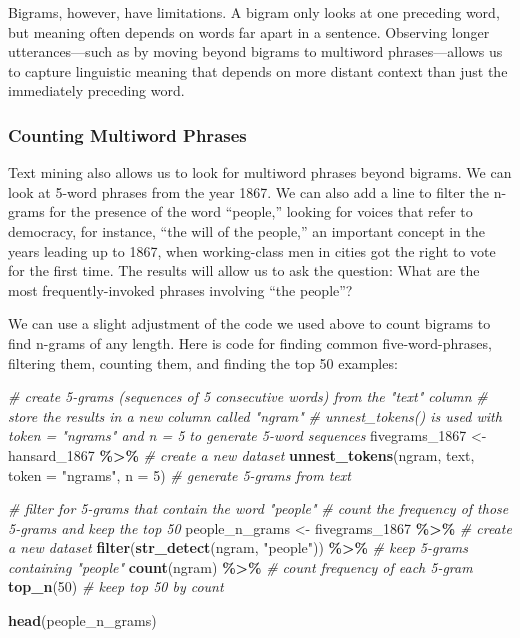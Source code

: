 \documentclass[
]{article}
\newenvironment{Shaded}{\begin{snugshade}}{\end{snugshade}}
\newcommand{\AttributeTok}[1]{\textcolor[rgb]{0.13,0.29,0.53}{#1}}
\newcommand{\CommentTok}[1]{\textcolor[rgb]{0.56,0.35,0.01}{\textit{#1}}}
\newcommand{\DecValTok}[1]{\textcolor[rgb]{0.00,0.00,0.81}{#1}}
\newcommand{\FunctionTok}[1]{\textcolor[rgb]{0.13,0.29,0.53}{\textbf{#1}}}
\newcommand{\NormalTok}[1]{#1}
\newcommand{\OtherTok}[1]{\textcolor[rgb]{0.56,0.35,0.01}{#1}}
\newcommand{\SpecialCharTok}[1]{\textcolor[rgb]{0.81,0.36,0.00}{\textbf{#1}}}
\newcommand{\StringTok}[1]{\textcolor[rgb]{0.31,0.60,0.02}{#1}}
\begin{document}
Bigrams, however, have limitations. A bigram only looks at one preceding
word, but meaning often depends on words far apart in a sentence.
Observing longer utterances---such as by moving beyond bigrams to
multiword phrases---allows us to capture linguistic meaning that depends
on more distant context than just the immediately preceding word.

\subsubsection{Counting Multiword
Phrases}\label{counting-multiword-phrases}

Text mining also allows us to look for multiword phrases beyond bigrams.
We can look at 5-word phrases from the year 1867. We can also add a line
to filter the n-grams for the presence of the word ``people,'' looking
for voices that refer to democracy, for instance, ``the will of the
people,'' an important concept in the years leading up to 1867, when
working-class men in cities got the right to vote for the first time.
The results will allow us to ask the question: What are the most
frequently-invoked phrases involving ``the people''?

We can use a slight adjustment of the code we used above to count
bigrams to find n-grams of any length. Here is code for finding common
five-word-phrases, filtering them, counting them, and finding the top 50
examples:

\begin{Shaded}
\begin{Highlighting}[]
\CommentTok{\# create 5{-}grams (sequences of 5 consecutive words) from the "text" column}
\CommentTok{\# store the results in a new column called "ngram"}
\CommentTok{\# unnest\_tokens() is used with token = "ngrams" and n = 5 to generate 5{-}word sequences}
\NormalTok{fivegrams\_1867 }\OtherTok{\textless{}{-}}\NormalTok{ hansard\_1867 }\SpecialCharTok{\%\textgreater{}\%} \CommentTok{\# create a new dataset}
  \FunctionTok{unnest\_tokens}\NormalTok{(ngram, text, }\AttributeTok{token =} \StringTok{"ngrams"}\NormalTok{, }\AttributeTok{n =} \DecValTok{5}\NormalTok{) }\CommentTok{\# generate 5{-}grams from text}

\CommentTok{\# filter for 5{-}grams that contain the word "people"}
\CommentTok{\# count the frequency of those 5{-}grams and keep the top 50}
\NormalTok{people\_n\_grams }\OtherTok{\textless{}{-}}\NormalTok{ fivegrams\_1867 }\SpecialCharTok{\%\textgreater{}\%} \CommentTok{\# create a new dataset}
  \FunctionTok{filter}\NormalTok{(}\FunctionTok{str\_detect}\NormalTok{(ngram, }\StringTok{"people"}\NormalTok{)) }\SpecialCharTok{\%\textgreater{}\%} \CommentTok{\# keep 5{-}grams containing "people"}
  \FunctionTok{count}\NormalTok{(ngram) }\SpecialCharTok{\%\textgreater{}\%} \CommentTok{\# count frequency of each 5{-}gram}
  \FunctionTok{top\_n}\NormalTok{(}\DecValTok{50}\NormalTok{) }\CommentTok{\# keep top 50 by count}

\FunctionTok{head}\NormalTok{(people\_n\_grams)}
\end{Highlighting}
\end{Shaded}
\end{document}
